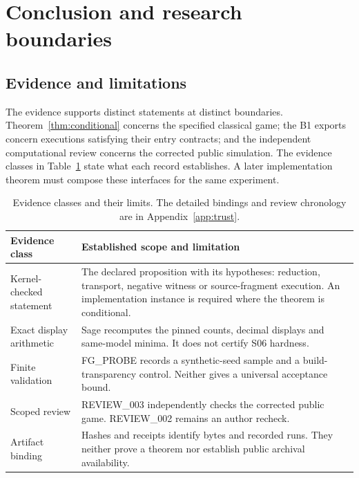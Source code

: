 \section{Conclusion and research boundaries}\label{sec:limits}
\subsection{Evidence and limitations}\label{sec:evidence}
The evidence supports distinct statements at distinct boundaries.
Theorem~\ref{thm:conditional} concerns the specified classical game;
the B1 exports concern executions satisfying their entry contracts;
and the independent computational review concerns the corrected public
simulation. The evidence classes in Table~\ref{tab:evidence} state what
each record establishes. A later implementation theorem must compose
these interfaces for the same experiment.

\begin{table}[!htbp]
\centering\small
\begin{tabular}{@{}>{\raggedright\arraybackslash}p{}>{\raggedright\arraybackslash}p{}@{}}
\toprule
Evidence class & Established scope and limitation \\
\midrule
Kernel-checked statement & The declared proposition with its hypotheses:
 reduction, transport, negative witness or source-fragment execution.
 An implementation instance is required where the theorem is conditional. \\
Exact display arithmetic & Sage recomputes the pinned counts, decimal
 displays and same-model minima. It does not certify S06 hardness. \\
Finite validation & FG\_PROBE records a synthetic-seed sample and a
 build-transparency control. Neither gives a universal acceptance bound. \\
Scoped review & REVIEW\_003 independently checks the corrected public
 game. REVIEW\_002 remains an author recheck. \\
Artifact binding & Hashes and receipts identify bytes and recorded runs.
 They neither prove a theorem nor establish public archival availability. \\
\bottomrule
\end{tabular}
\caption{Evidence classes and their limits. The detailed bindings and
review chronology are in Appendix~\ref{app:trust}.}
\label{tab:evidence}
\end{table}

